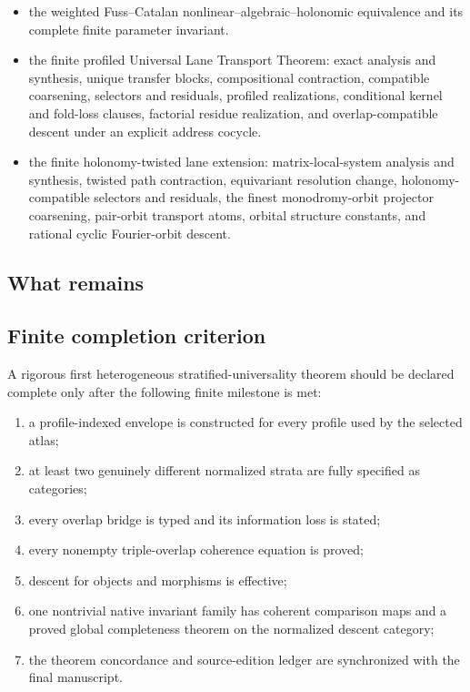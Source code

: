 \begin{itemize}
\item the weighted Fuss--Catalan nonlinear--algebraic--holonomic equivalence and its complete finite parameter invariant.
\item the finite profiled Universal Lane Transport Theorem: exact analysis and synthesis, unique transfer blocks, compositional contraction, compatible coarsening, selectors and residuals, profiled realizations, conditional kernel and fold-loss clauses, factorial residue realization, and overlap-compatible descent under an explicit address cocycle.
\item the finite holonomy-twisted lane extension: matrix-local-system analysis and synthesis, twisted path contraction, equivariant resolution change, holonomy-compatible selectors and residuals, the finest monodromy-orbit projector coarsening, pair-orbit transport atoms, orbital structure constants, and rational cyclic Fourier-orbit descent.
\end{itemize}

\subsection{What remains}



\subsection{Finite completion criterion}

A rigorous first heterogeneous stratified-universality theorem should be declared complete only after the following finite milestone is met:

\begin{enumerate}
\item a profile-indexed envelope is constructed for every profile used by the selected atlas;
\item at least two genuinely different normalized strata are fully specified as categories;
\item every overlap bridge is typed and its information loss is stated;
\item every nonempty triple-overlap coherence equation is proved;
\item descent for objects and morphisms is effective;
\item one nontrivial native invariant family has coherent comparison maps and a proved global completeness theorem on the normalized descent category;
\item the theorem concordance and source-edition ledger are synchronized with the final manuscript.
\end{enumerate}

